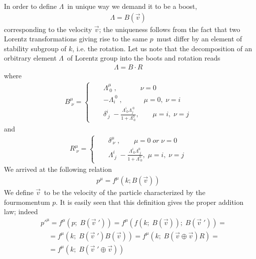 \documentclass[a4paper,12pt]{article}
\begin{document}
In order to define $\Lambda $\ in unique way we demand it to be a boost,
\begin{eqnarray}
\Lambda =B(\vec{v}) \label{w5}
\end{eqnarray}
corresponding to the velocity $\vec{v}$; the uniqueness follows from the fact that two Lorentz transformations giving rise
to the same $p$\ must differ by an element of stability subgroup of $k$, i.e. the rotation. Let us note
that the decomposition of an orbitrary element $\Lambda $\ of Lorentz group into the boots and rotation reads
\begin{eqnarray}
\Lambda =B\cdot R \label{w6}
\end{eqnarray}
where 
\begin{eqnarray}
B^{\mu}_{\;\nu}=\left\{
\begin{array}{ccl}
&&\Lambda^{\mu}_{\;0}\; ,\;\;\;\;\;\;\;\;\;\;\;\;  \nu =0 \\
&&-\Lambda_i^{\;0} \;,\;\;\;\;\;\;\;\;\;\;\;\mu =0,\;\nu=i \\
&&\delta^i_{\;j} \;-\frac{\Lambda^i_{\;0}\Lambda_j^{\;0}}{1+\Lambda^0_{\;0}},\;\;\;\;\;\;\;\mu =i,\;\nu =j
\end{array}
\right.  \label{w7}
\end{eqnarray}
and 
\begin{eqnarray}
R^{\mu}_{\;\nu}=\left\{
\begin{array}{ccl}
&&\delta^{\mu}_{\;\nu}\; ,\;\;\;\;\;\;\;  \mu =0\;or \;\nu =0 \\
&&\Lambda_{\;j}^{i}\;-\frac{\Lambda^i_{\;0}\Lambda^0_{\;j}}{1+\Lambda^0_{\;0}},\;\mu =i,\;\nu =j
\end{array}
\right.  \label{w8}
\end{eqnarray}
We arrived at the following relation 
\begin{eqnarray}
p^{\mu}=f^{\mu}(k;B(\vec{v}))\label{w9}
\end{eqnarray}
We define $\vec{v}$\ to be the velocity of the particle characterized by the fourmomentum $p$. It is easily
seen that this definition gives the proper addition law; indeed
\begin{eqnarray}
&&p'^{\mu}=f^{\mu}(p;\;B(\vec{v}\;'))=f^{\mu}(f(k;\;B(\vec{v}));\;B(\vec{v}\;'))= \nonumber \\
&&\;\;\;\;=f^{\mu}(k;\;B(\vec{v}\;')B(\vec{v}))=f^{\mu}(k;\;B(\vec{v}\oplus \vec{v})R)=\nonumber \\
&&\;\;\;\;=f^{\mu}(k;\;B(\vec{v}\;' \oplus \vec{v}))\label{w10}
\end{eqnarray}
\end{document}
